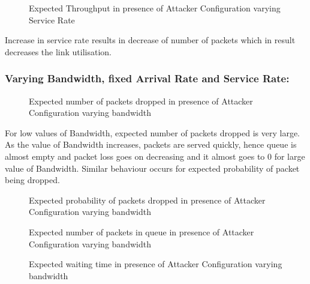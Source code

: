 \begin{figure}[H]
		\centering
		\caption{{Expected Throughput in presence of Attacker Configuration varying Service Rate}}
		\label{fig:figcf}
\end{figure}

Increase in service rate results in decrease of number of packets which in result decreases the link utilisation.
 
\subsubsection*{Varying Bandwidth, fixed Arrival Rate and Service Rate:}

\begin{figure}[H]
		\centering
		\caption{{Expected number of packets dropped in presence of Attacker Configuration varying bandwidth}}
		\label{fig:figdb}
\end{figure}

\pagebreak

For low values of Bandwidth, expected number of packets dropped is very large. As the value of Bandwidth increases, packets are served quickly, hence queue is almost empty and packet loss goes on decreasing and it almost goes to 0 for large value of Bandwidth. Similar behaviour occurs for expected probability of packet being dropped. 

\begin{figure}[H]
		\centering
		\caption{{Expected probability of packets dropped in presence of Attacker Configuration varying bandwidth}}
		\label{fig:figdc}
\end{figure}

\begin{figure}[H]
		\centering
		\caption{{Expected number of packets in queue in presence of Attacker Configuration varying bandwidth}}
		\label{fig:figdd}
\end{figure}

\pagebreak

\begin{figure}[H]
		\centering
		\caption{{Expected waiting time in presence of Attacker Configuration varying bandwidth}}
		\label{fig:figde}
\end{figure}

